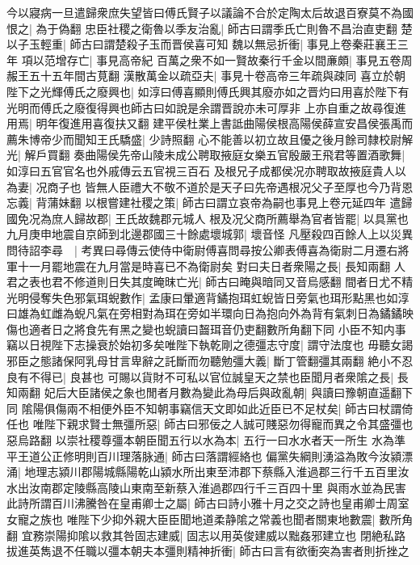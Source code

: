 今以寢病一旦遣歸衆庶失望皆曰傅氏賢子以議論不合於定陶太后故退百寮莫不為國恨之|{
	為于偽翻}
忠臣社稷之衛魯以季友治亂|{
	師古曰謂季氏亡則魯不昌治直吏翻}
楚以子玉輕重|{
	師古曰謂楚殺子玉而晋侯喜可知}
魏以無忌折衝|{
	事見上卷秦莊襄王三年}
項以范增存亡|{
	事見高帝紀}
百萬之衆不如一賢故秦行千金以間亷頗|{
	事見五卷周赧王五十五年間古莧翻}
漢散萬金以疏亞夫|{
	事見十卷高帝三年疏與疎同}
喜立於朝陛下之光輝傅氏之廢興也|{
	如淳曰傅喜顯則傅氏興其廢亦如之晋灼曰用喜於陛下有光明而傅氏之廢復得興也師古曰如說是余謂晋說亦未可厚非}
上亦自重之故尋復進用焉|{
	明年復進用喜復扶又翻}
建平侯杜業上書詆曲陽侯根高陽侯薛宣安昌侯張禹而薦朱博帝少而聞知王氏驕盛|{
	少詩照翻}
心不能善以初立故且優之後月餘司隸校尉解光|{
	解戶買翻}
奏曲陽侯先帝山陵未成公聘取掖庭女樂五官殷嚴王飛君等置酒歌舞|{
	如淳曰五官官名也外戚傳云五官視三百石}
及根兄子成都侯况亦聘取故掖庭貴人以為妻|{
	况商子也}
皆無人臣禮大不敬不道於是天子曰先帝遇根况父子至厚也今乃背恩忘義|{
	背蒲妹翻}
以根嘗建社稷之策|{
	師古曰謂立哀帝為嗣也事見上卷元延四年}
遣歸國免况為庶人歸故郡|{
	王氏故魏郡元城人}
根及况父商所薦舉為官者皆罷|{
	以具黨也}
九月庚申地震自京師到北邊郡國三十餘處壞城郭|{
	壞音怪}
凡壓殺四百餘人上以災異問待詔李尋　|{
	考異曰尋傳云使侍中衛尉傅喜問尋按公卿表傅喜為衛尉二月遷右將軍十一月罷地震在九月當是時喜已不為衛尉矣}
對曰夫日者衆陽之長|{
	長知兩翻}
人君之表也君不修道則日失其度晻昩亡光|{
	師古曰晻與暗同又音烏感翻}
間者日尤不精光明侵奪失色邪氣珥蜺數作|{
	孟康曰暈適背鐍抱珥虹蜺皆日旁氣也珥形點黑也如淳曰雄為虹雌為蜺凡氣在旁相對為珥在旁如半環向日為抱向外為背有氣刺日為鐍鐍映傷也適者日之將食先有黑之變也蜺讀曰齧珥音仍吏翻數所角翻下同}
小臣不知内事竊以日視陛下志操衰於始初多矣唯陛下執乾剛之德彊志守度|{
	謂守法度也}
毋聽女謁邪臣之態諸保阿乳母甘言卑辭之託斷而勿聽勉彊大義|{
	斷丁管翻彊其兩翻}
絶小不忍良有不得已|{
	良甚也}
可賜以貨財不可私以官位誠皇天之禁也臣聞月者衆隂之長|{
	長知兩翻}
妃后大臣諸侯之象也閒者月數為變此為母后與政亂朝|{
	與讀曰豫朝直遥翻下同}
隂陽俱傷兩不相便外臣不知朝事竊信天文即如此近臣已不足杖矣|{
	師古曰杖謂倚任也}
唯陛下親求賢士無彊所惡|{
	師古曰邪佞之人誠可賤惡勿得寵而異之令其盛彊也惡烏路翻}
以崇社稷尊彊本朝臣聞五行以水為本|{
	五行一曰水水者天一所生}
水為準平王道公正修明則百川理落脉通|{
	師古曰落謂經絡也}
偏黨失綱則湧溢為敗今汝潁漂涌|{
	地理志潁川郡陽城縣陽乾山潁水所出東至沛郡下蔡縣入淮過郡三行千五百里汝水出汝南郡定陵縣高陵山東南至新蔡入淮過郡四行千三百四十里}
與雨水並為民害此詩所謂百川沸騰咎在皇甫卿士之屬|{
	師古曰詩小雅十月之交之詩也皇甫卿士周室女寵之族也}
唯陛下少抑外親大臣臣聞地道柔静隂之常義也聞者關東地數震|{
	數所角翻}
宜務崇陽抑隂以救其咎固志建威|{
	固志以用英俊建威以黜姦邪建立也}
閉絶私路拔進英雋退不任職以彊本朝夫本彊則精神折衝|{
	師古曰言有欲衝突為害者則折挫之}
